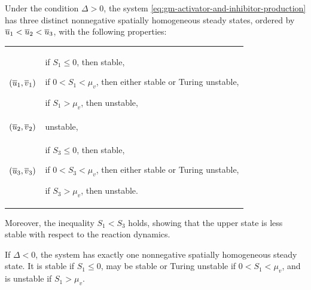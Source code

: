 \begin{proposition}
\label{prop:activator-production-steady-states}
Under the condition \(\Delta>0\), the system
\eqref{eq:gm-activator-and-inhibitor-production} has three distinct
nonnegative spatially homogeneous steady states, ordered by
\(\overline{u}_1<\overline{u}_2<\overline{u}_3\), with the following properties:
\begin{center}
    \begin{tabular}{@{}>{\centering\arraybackslash}m{}
                        @{\qquad}m{}@{}}
        \((\overline{u}_1,\overline{v}_1)\) &
        if \(S_1\leqslant0\), then stable,\par\vspace{0.2em}
        if \(0<S_1<\mu_v\), then either stable or Turing unstable,\par\vspace{0.2em}
        if \(S_1>\mu_v\), then unstable,
        \\[2.0em]
        \((\overline{u}_2,\overline{v}_2)\) & unstable, \\[0.5em]
        \((\overline{u}_3,\overline{v}_3)\) &
        if \(S_3\leqslant0\), then stable,\par\vspace{0.2em}
        if \(0<S_3<\mu_v\), then either stable or Turing unstable,\par\vspace{0.2em}
        if \(S_3>\mu_v\), then unstable.
    \end{tabular}
\end{center}
Moreover, the inequality \(S_1<S_3\) holds, showing that the upper state is
less stable with respect to the reaction dynamics.

If \(\Delta<0\), the system has exactly one nonnegative spatially homogeneous
steady state. It is stable if \(S_1\leqslant0\), may be
stable or Turing unstable if \(0<S_1<\mu_v\), and is unstable if
\(S_1>\mu_v\).
\end{proposition}

